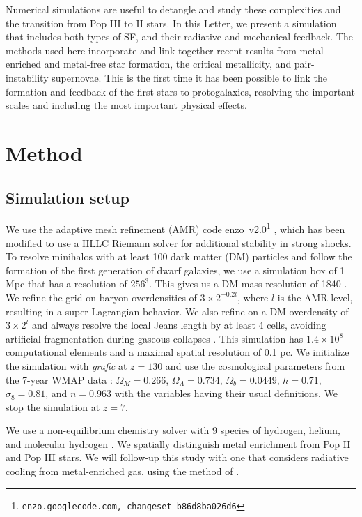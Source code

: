 \documentclass[apjl]{emulateapj}
\newcommand{\Ms}{\ifmmode{M_\odot}\else{$M_\odot$}\fi}
\begin{document}
Numerical simulations are useful to detangle and study these
complexities and the transition from Pop III to II stars.  In this
Letter, we present a simulation that includes both types of SF, and
their radiative and mechanical feedback.  The methods used here
incorporate and link together recent results from metal-enriched and
metal-free star formation, the critical metallicity, and
pair-instability supernovae.  This is the first time it has been
possible to link the formation and feedback of the first stars to
protogalaxies, resolving the important scales and including the most
important physical effects.

\section{Method}
\label{sec:setup}

\subsection{Simulation setup}

We use the adaptive mesh refinement (AMR) code
enzo~v2.0\footnote{\texttt{enzo.googlecode.com, changeset
    b86d8ba026d6}} \citep{OShea2004}, which has been modified to use a
HLLC Riemann solver \citep{Toro94_HLLC} for additional stability in
strong shocks.  To resolve minihalos with at least 100 dark matter
(DM) particles and follow the formation of the first generation of
dwarf galaxies, we use a simulation box of 1 Mpc that has a resolution
of $256^3$.  This gives us a DM mass resolution of 1840 \Ms.  We
refine the grid on baryon overdensities of $3 \times 2^{-0.2l}$, where
$l$ is the AMR level, resulting in a super-Lagrangian behavior.  We
also refine on a DM overdensity of $3 \times 2^l$ and always resolve
the local Jeans length by at least 4 cells, avoiding artificial
fragmentation during gaseous collapses \citep{Truelove97}.  This
simulation has $1.4 \times 10^8$ computational elements and a maximal
spatial resolution of 0.1 pc.  We initialize the simulation with
\textsl{grafic} \citep{Bertschinger01} at $z = 130$ and use the
cosmological parameters from the 7-year WMAP data \citep{WMAP7}:
$\Omega_M = 0.266$, $\Omega_\Lambda = 0.734$, $\Omega_b = 0.0449$, $h
= 0.71$, $\sigma_8 = 0.81$, and $n = 0.963$ with the variables having
their usual definitions.  We stop the simulation at $z=7$.

We use a non-equilibrium chemistry solver with 9 species of hydrogen,
helium, and molecular hydrogen \citep{Abel97}.  We spatially
distinguish metal enrichment from Pop II and Pop III stars.  We will
follow-up this study with one that considers radiative cooling from
metal-enriched gas, using the method of \citet{2008MNRAS.385.1443S}.
\end{document}
